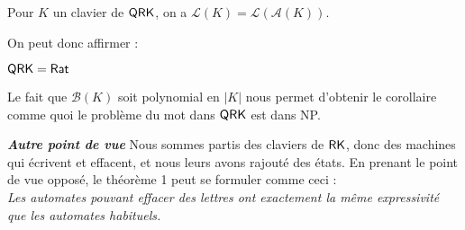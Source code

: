 \documentclass[12pt, a4paper]{article}
\renewcommand{\L}{\mathcal{L}}
\newcommand{\A}{\mathcal{A}}
\newcounter{thm}
\begin{document}
    \begin{bisimautomclav}\label{lklak}
        Pour $K$ un clavier de $\mathsf{QRK}$, on a $\L(K) = \L(\A(K))$.
    \end{bisimautomclav}
    \vspace{10pt}
    On peut donc affirmer :
    \begin{QRKegalRat}\label{th1}
        $\mathsf{QRK} = \mathsf{Rat}$
    \end{QRKegalRat}
    Le fait que $\mathcal{B}(K)$ soit polynomial en $|K|$ nous permet d'obtenir le corollaire comme quoi le problème du mot dans $\mathsf{QRK}$ est dans NP.
    \begin{thmbox}[L]{\textbf{\emph{Autre point de vue}}}
        Nous sommes partis des claviers de $\mathsf{RK}$, donc des machines qui écrivent et effacent, et nous leurs avons rajouté des états.
        En prenant le point de vue opposé, le théorème 1 peut se formuler comme ceci : \\
        \emph{Les automates pouvant effacer des lettres ont exactement la même expressivité que les automates habituels.}
    \end{thmbox}
\end{document}
